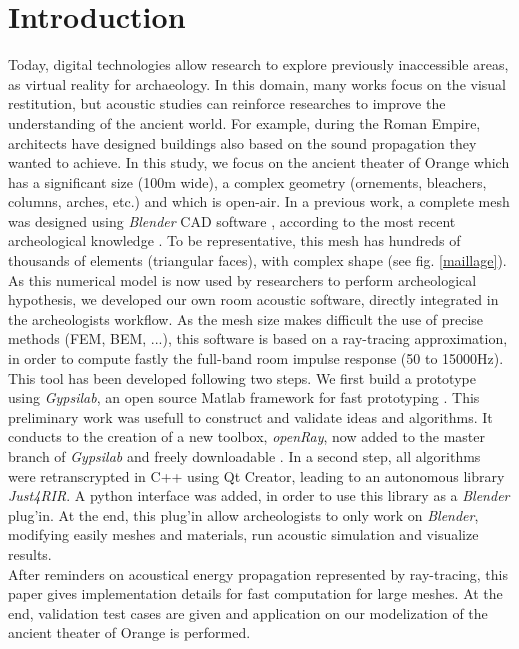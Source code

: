 \documentclass[AMA,STIX1COL]{WileyNJD-v2}
\begin{document}
\section*{Introduction}
\label{sec1}
Today, digital technologies allow research to explore previously inaccessible areas, as virtual reality for archaeology. In this domain, many works focus on the visual restitution, but acoustic studies can reinforce researches to improve the understanding of the ancient world. For example, during the Roman Empire, architects have designed buildings also based on the sound propagation they wanted to achieve\cite{vitruve}. In this study, we focus on the ancient theater of Orange which has a significant size (100m wide), a complex geometry (ornements, bleachers, columns, arches, etc.) and which is open-air. In a previous work, a complete mesh was designed using \textit{Blender} CAD software \cite{doc_blender}, according to the most recent archeological knowledge \cite{theseRobin}. To be representative, this mesh has hundreds of thousands of elements (triangular faces), with complex shape (see fig. \ref{maillage}). As this numerical model is now used by researchers to perform archeological hypothesis, we developed our own room acoustic software, directly integrated in the archeologists workflow. As the mesh size makes difficult the use of precise methods (FEM, BEM, ...), this software is based on a ray-tracing approximation, in order to compute fastly the full-band room impulse response (50 to 15000Hz). This tool has been developed following two steps. We first build a prototype using \textit{Gypsilab}, an open source Matlab framework for fast prototyping \cite{gypsilab}. This preliminary work was usefull to construct and validate ideas and algorithms. It conducts to the creation of a new toolbox, \textit{openRay}, now added to the master branch of \textit{Gypsilab} and freely downloadable \cite{githubGypsi}. In a second step, all algorithms were retranscrypted in C++ using Qt Creator, leading to an autonomous library \textit{Just4RIR}. A python interface was added, in order to use this library as a \textit{Blender} plug'in. At the end, this plug'in allow archeologists to only work on \textit{Blender}, modifying easily meshes and materials, run acoustic simulation and visualize results. \\
After reminders on acoustical energy propagation represented by ray-tracing, this paper gives implementation details for fast computation for large meshes. At the end, validation test cases are given and application on our modelization of the ancient theater of Orange is performed. 
\end{document}
